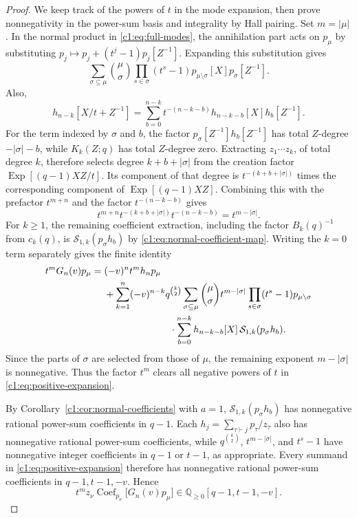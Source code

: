 \documentclass[12pt,reqno,a4paper]{amsart}
\numberwithin{equation}{section}
\numberwithin{figure}{section}
\theoremstyle{plain}
\theoremstyle{definition}
\DeclareMathOperator{\Coef}{Coef}
\begin{document}
\begin{proof}
We keep track of the powers of $t$ in the mode expansion, then prove
nonnegativity in the power-sum basis and integrality by Hall pairing.
Set $m=|\mu|$.  In the normal product in
\eqref{c1:eq:full-modes}, the annihilation part acts on $p_\mu$ by
substituting $p_j\mapsto p_j+(t^j-1)p_j[Z^{-1}]$.
Expanding this substitution gives
\[
 \sum_{\sigma\subseteq\mu}\binom\mu\sigma
       \prod_{s\in\sigma}(t^s-1)
       p_{\mu\setminus\sigma}[X]p_\sigma[Z^{-1}].
\]
Also,
\[
 h_{n-k}[X/t+Z^{-1}]
 =\sum_{b=0}^{n-k}t^{-(n-k-b)}
       h_{n-k-b}[X]h_b[Z^{-1}].
\]
For the term indexed by $\sigma$ and $b$, the factor
$p_\sigma[Z^{-1}]h_b[Z^{-1}]$ has total $Z$-degree
$-|\sigma|-b$, while $K_k(Z;q)$ has total $Z$-degree zero.
Extracting $z_1\cdots z_k$, of total degree $k$, therefore selects
degree $k+b+|\sigma|$ from the creation factor
$\operatorname{Exp}[(q-1)XZ/t]$.  Its component of that degree is
$t^{-(k+b+|\sigma|)}$ times the corresponding component of
$\operatorname{Exp}[(q-1)XZ]$.  Combining this with the prefactor
$t^{m+n}$ and the factor $t^{-(n-k-b)}$ gives
\[
 t^{m+n}t^{-(k+b+|\sigma|)}t^{-(n-k-b)}
       =t^{m-|\sigma|}.
\]
For $k\geq1$, the remaining coefficient extraction, including the factor
$B_k(q)^{-1}$ from $c_k(q)$, is $\mathcal S_{1,k}(p_\sigma h_b)$ by
\eqref{c1:eq:normal-coefficient-map}.  Writing the $k=0$ term separately
gives the finite identity
\begin{equation}\label{c1:eq:positive-expansion}
 \begin{aligned}
 t^mG_n(v)p_\mu
 ={}&(-v)^nt^mh_np_\mu\\
 &+\sum_{k=1}^n(-v)^{n-k}q^{\binom{k}{2}}
   \sum_{\sigma\subseteq\mu}\binom\mu\sigma
       t^{m-|\sigma|}\prod_{s\in\sigma}(t^s-1)
       p_{\mu\setminus\sigma}\\
 &\hspace{24mm}\cdot
       \sum_{b=0}^{n-k}h_{n-k-b}[X]\,
                    \mathcal S_{1,k}(p_\sigma h_b).
 \end{aligned}
\end{equation}
Since the parts of $\sigma$ are selected from those of $\mu$, the
remaining exponent $m-|\sigma|$ is nonnegative.  Thus the factor
$t^m$ clears all negative powers of $t$ in \eqref{c1:eq:positive-expansion}.

By Corollary~\ref{c1:cor:normal-coefficients} with $a=1$,
$\mathcal S_{1,k}(p_\sigma h_b)$ has nonnegative rational power-sum
coefficients in $q-1$.  Each $h_j=\sum_{\tau\vdash j}p_\tau/z_\tau$
also has nonnegative rational power-sum coefficients, while
$q^{\binom{k}{2}}$, $t^{m-|\sigma|}$, and $t^s-1$ have nonnegative
integer coefficients in $q-1$ or $t-1$, as appropriate.
Every summand in \eqref{c1:eq:positive-expansion} therefore has
nonnegative rational power-sum coefficients in $q-1,t-1,-v$.
Hence
\begin{equation}\label{eq:refaudit-macdonald-rational-positivity}
 t^mz_\nu\Coef_{p_\nu}\bigl[G_n(v)p_\mu\bigr]
       \in\mathbb Q_{\geq0}[q-1,t-1,-v].
\end{equation}


\end{proof}
\end{document}
